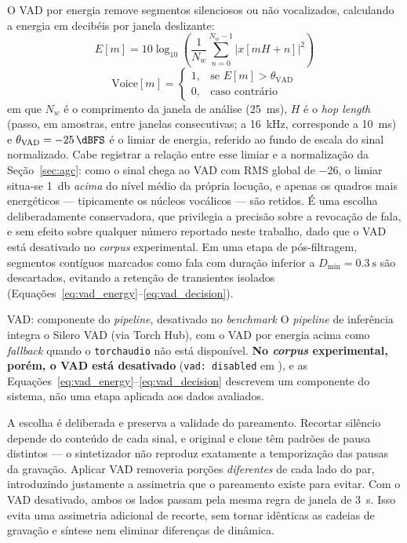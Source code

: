\documentclass[12pt,a4paper]{article}
\begin{document}
O VAD por energia remove segmentos silenciosos ou não vocalizados,
calculando a energia em decibéis por janela deslizante:
\begin{equation}
	\label{eq:vad_energy}
	E[m] = 10\log_{10}\!\left(\frac{1}{N_w}\sum_{n=0}^{N_w-1}|x[mH+n]|^2\right)
\end{equation}
\begin{equation}
	\label{eq:vad_decision}
	\text{Voice}[m] = \begin{cases}
		1, & \text{se } E[m] > \theta_{\mathrm{VAD}}\\
		0, & \text{caso contrário}
	\end{cases}
\end{equation}
\noindent
em que $N_w$ é o comprimento da janela de análise (\SI{25}{\milli\second}),
$H$ é o \textit{hop length} (passo, em amostras, entre janelas consecutivas;
a \SI{16}{\kilo\hertz}, corresponde a \SI{10}{\milli\second}) e
$\theta_{\mathrm{VAD}} = \SI{-25}{\dBFS}$ é o limiar de energia, referido ao
fundo de escala do sinal normalizado. Cabe registrar a relação entre esse
limiar e a normalização da Seção~\ref{sec:agc}: como o sinal chega ao VAD com
RMS global de \SI{-26}{\dBFS}, o limiar situa-se \SI{1}{\decibel}
\emph{acima} do nível médio da própria locução, e apenas os quadros mais
energéticos --- tipicamente os núcleos vocálicos --- são retidos. É uma escolha
deliberadamente conservadora, que privilegia a precisão sobre a revocação de
fala, e sem efeito sobre qualquer número reportado neste trabalho, dado que o
VAD está desativado no \textit{corpus} experimental. Em uma etapa de
pós-filtragem, segmentos
contíguos marcados como fala com duração inferior a
$D_{\mathrm{min}} = \SI{0,3}{\second}$ são
descartados, evitando a retenção de transientes isolados
(Equações~\ref{eq:vad_energy}--\ref{eq:vad_decision}).

\begin{infobox}{VAD: componente do \textit{pipeline}, desativado no
		\textit{benchmark}}
	O \textit{pipeline} de inferência integra o Silero VAD (via Torch Hub), com o
	VAD por energia acima como \textit{fallback} quando o \texttt{torchaudio} não
	está disponível. \textbf{No \textit{corpus} experimental, porém, o VAD está
		desativado} (\texttt{vad: disabled} em ), e as
	Equações~\ref{eq:vad_energy}--\ref{eq:vad_decision} descrevem um componente do
	sistema, não uma etapa aplicada aos dados avaliados.
	
	A escolha é deliberada e preserva a validade do pareamento. Recortar silêncio
	depende do conteúdo de cada sinal, e original e clone têm padrões de pausa
	distintos --- o sintetizador não reproduz exatamente a temporização das pausas
	da gravação. Aplicar VAD removeria porções \emph{diferentes} de cada lado do
	par, introduzindo justamente a assimetria que o pareamento existe para evitar.
	Com o VAD desativado, ambos os lados passam pela mesma regra de janela de
	\SI{3}{\second}. Isso evita uma assimetria adicional de recorte, sem tornar
	idênticas as cadeias de gravação e síntese nem eliminar diferenças de dinâmica.
\end{infobox}
\end{document}
